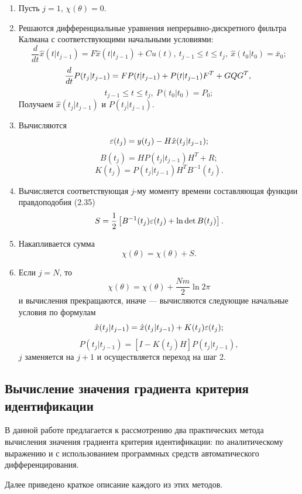 \documentclass[a4paper,14pt]{extarticle}
\begin{document}
\begin{enumerate}
\item Пусть $j = 1$, $\chi(\theta) = 0$.
\item Решаются дифференциальные уравнения непрерывно-дискретного фильтра
Калмана с соответствующими начальными условиями:
\[
\frac{d}{dt}\hat{x}(t|t_{j-1}) = F \hat{x}(t|t_{j-1}) + C u(t),\ 
t_{j-1} \le t \le t_j,\ \hat{x}(t_0|t_0) = \bar{x}_0;
\]
\[
\frac{d}{dt}P(t_j|t_{j-1}) = F P(t|t_{j-1}) + P(t|t_{j-1}) F^T + GQG^T,\\
\]
\[
t_{j-1} \le t \le t_j,\ P(t_0|t_0) = P_0;
\]
Получаем $\hat{x}(t_j|t_{j-1})$ и $P(t_j|t_{j-1})$.

\item Вычисляются
\[ \varepsilon(t_j) = y(t_j) - H \hat{x}(t_j|t_{j-1}); \]
\[ B(t_j) = H P(t_j|t_{j-1}) H^T + R; \]
\[
K(t_j) = P(t_j|t_{j-1}) H^T B^{-1}(t_j).
\]

\item Вычисляется соответствующая $j$-му моменту времени составляющая функции
правдоподобия (2.35)
\[
S = \frac{1}{2} \left[ B^{-1}(t_j) \varepsilon(t_j) + \ln \det B(t_j) \right].
\]

\item Накапливается сумма
\[
\chi(\theta) = \chi(\theta) + S.
\]

\item Если $j = N$, то
\[
\chi(\theta) = \chi(\theta) + \frac{Nm}{2} \ln 2\pi
\]
и вычисления прекращаются, иначе --- вычисляются следующие начальные условия по
формулам
\[
\hat{x}(t_j|t_{j-1}) = \hat{x}(t_j|t_{j-1}) + K(t_j) \varepsilon(t_j);
\]
\[
P(t_j|t_{j-1}) = \left[ I - K(t_j) H \right] P(t_j|t_{j-1}),
\]
$j$ заменяется на $j+1$ и осуществляется переход на шаг 2.

\end{enumerate}

\subsection[Вычисление значения градиента критерия идентификации]
{Вычисление значения градиента критерия \\идентификации}

В данной работе предлагается к рассмотрению два практических метода вычисления
значения градиента критерия идентификации: по аналитическому выражению и с
использованием программных средств автоматического дифференцирования.

Далее приведено краткое описание каждого из этих методов.
\end{document}
